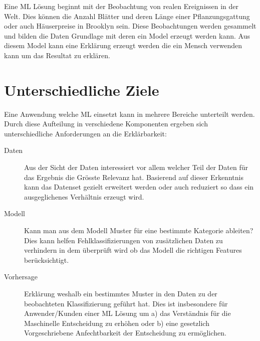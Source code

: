 \documentclass[
  12pt, %
  a4paper, %
  oneside, %
  openany, 
  numbers=noenddot, %
  BCOR=5mm, %
  parskip=half*, %
  thesis, %
]{bfhbook}
\begin{document}
Eine \Gls{ML} Lösung beginnt mit der Beobachtung von realen Ereignissen in der Welt. Dies können die Anzahl Blätter und deren Länge einer Pflanzungsgattung oder auch Häuserpreise in Brooklyn sein. Diese Beobachtungen werden gesammelt und bilden die Daten Grundlage mit deren ein Model erzeugt werden kann. Aus diesem Model kann eine Erklärung erzeugt werden die ein Mensch verwenden kann um das Resultat zu erklären.
\section{Unterschiedliche Ziele}
Eine Anwendung welche \Gls{ML} einsetzt kann in mehrere Bereiche unterteilt werden.  Durch diese Aufteilung in verschiedene  Komponenten ergeben sich unterschiedliche Anforderungen an die Erklärbarkeit: \parencite{XAI2018}

\begin{description}
\item[Daten]
Aus der Sicht der Daten interessiert vor allem welcher Teil der Daten für das Ergebnis die Grösste Relevanz hat. Basierend auf dieser Erkenntnis kann das Datenset gezielt erweitert werden oder auch reduziert so dass ein ausgeglichenes Verhältnis erzeugt wird.

\item[Modell]
Kann man aus dem Modell Muster für eine bestimmte Kategorie ableiten? Dies kann helfen Fehlklassifizierungen von zusätzlichen Daten zu verhindern in dem überprüft wird ob das Modell die richtigen Features berücksichtigt.

\item[Vorhersage]
Erklärung weshalb ein bestimmtes Muster in den Daten zu der beobachteten Klassifizierung geführt hat. Dies ist insbesondere für Anwender/Kunden einer ML Lösung um a) das Verständnis für die Maschinelle Entscheidung zu erhöhen oder b) eine gesetzlich Vorgeschriebene Anfechtbarkeit der Entscheidung zu ermöglichen.
\end{description}
\end{document}
